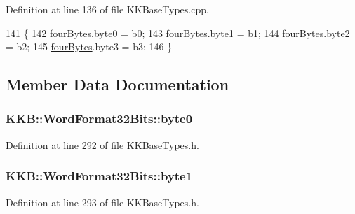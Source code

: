 Definition at line 136 of file K\+K\+Base\+Types.\+cpp.


\begin{DoxyCode}
141 \{
142   \hyperlink{union_k_k_b_1_1_word_format32_bits_a377fc22bfc20aaa559f6572b55663069}{fourBytes}.byte0 = b0;
143   \hyperlink{union_k_k_b_1_1_word_format32_bits_a377fc22bfc20aaa559f6572b55663069}{fourBytes}.byte1 = b1;
144   \hyperlink{union_k_k_b_1_1_word_format32_bits_a377fc22bfc20aaa559f6572b55663069}{fourBytes}.byte2 = b2;
145   \hyperlink{union_k_k_b_1_1_word_format32_bits_a377fc22bfc20aaa559f6572b55663069}{fourBytes}.byte3 = b3;
146 \}
\end{DoxyCode}


\subsection{Member Data Documentation}
\subsubsection[{\texorpdfstring{byte0}{byte0}}]{ K\+K\+B\+::\+Word\+Format32\+Bits\+::byte0}\hypertarget{union_k_k_b_1_1_word_format32_bits_a7172ef166d47f672768eaf94666ec5cd}{}\label{union_k_k_b_1_1_word_format32_bits_a7172ef166d47f672768eaf94666ec5cd}


Definition at line 292 of file K\+K\+Base\+Types.\+h.

\subsubsection[{\texorpdfstring{byte1}{byte1}}]{ K\+K\+B\+::\+Word\+Format32\+Bits\+::byte1}\hypertarget{union_k_k_b_1_1_word_format32_bits_a3a4cec5553f28a1010a3a1bb6f182f3f}{}\label{union_k_k_b_1_1_word_format32_bits_a3a4cec5553f28a1010a3a1bb6f182f3f}


Definition at line 293 of file K\+K\+Base\+Types.\+h.

